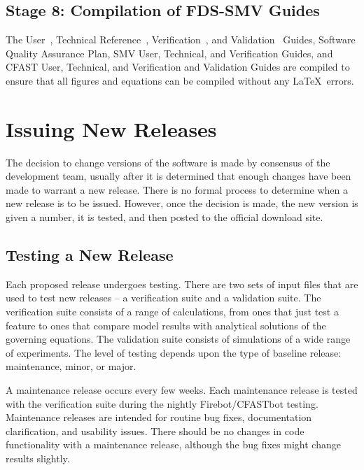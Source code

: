 \documentclass[11pt]{book}
\begin{document}
\subsection*{Stage 8: Compilation of FDS-SMV Guides}

The User~\cite{FDS_Users_Guide}, Technical Reference~\cite{FDS_Math_Guide}, Verification~\cite{FDS_Verification_Guide}, and Validation~\cite{FDS_Validation_Guide} Guides, Software Quality Assurance Plan, SMV User, Technical, and Verification Guides, and CFAST User, Technical, and Verification and Validation Guides are compiled to ensure that all figures and equations can be compiled without any \LaTeX\ errors.


\section{Issuing New Releases}

The decision to change versions of the software is made by consensus of the development team, usually after it is determined that enough changes have been made to warrant a new release. There is no formal process to determine when a new release is to be issued. However, once the decision is made, the new version is given a number, it is tested, and then posted to the official download site.


\subsection{Testing a New Release}

Each proposed release undergoes testing. There are two sets of input files that are used to test new releases -- a verification suite and a validation suite. The verification suite consists of a range of calculations, from ones that just test a feature to ones that compare model results with analytical solutions of the governing equations. The validation suite consists of simulations of a wide range of experiments. The level of testing depends upon the type of baseline release: maintenance, minor, or major.

A maintenance release occurs every few weeks. Each maintenance release is tested with the verification suite during the nightly Firebot/CFASTbot testing. Maintenance releases are intended for routine bug fixes, documentation clarification, and usability issues. There should be no changes in code functionality with a maintenance release, although the bug fixes might change results slightly.
\end{document}
